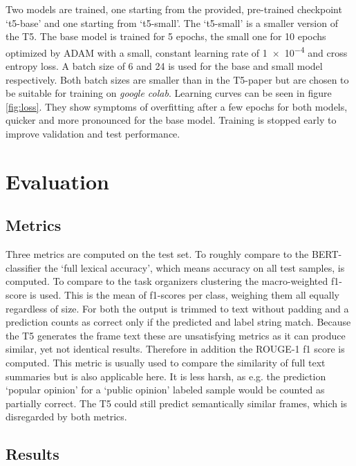 \documentclass[11pt,a4paper,onecolumn,oneside,notitlepage]{article}
\begin{document}
Two models are trained, one starting from the provided, pre-trained checkpoint ‘t5-base’ and one starting from ‘t5-small’. The ‘t5-small’ is a smaller version of the T5. The base model is trained for \num{5} epochs, the small one for \num{10} epochs optimized by ADAM \citep{kingma2017adam} with a small, constant learning rate of \num{1e-4} and cross entropy loss. A batch size of 6 and 24 is used for the base and small model respectively. Both batch sizes are smaller than in the T5-paper but are chosen to be suitable for training on \textit{google colab}. Learning curves can be seen in figure \ref{fig:loss}. They show symptoms of overfitting after a few epochs for both models, quicker and more pronounced for the base model. Training is stopped early to improve validation and test performance.

\section{Evaluation}
\subsection{Metrics}
Three metrics are computed on the test set. To roughly compare to the BERT-classifier the ‘full lexical accuracy’, which means accuracy on all test samples, is computed. To compare to the task organizers clustering the macro-weighted f1-score is used. This is the mean of f1-scores per class, weighing them all equally regardless of size. For both the output is trimmed to text without padding and a prediction counts as correct only if the predicted and label string match. Because the T5 generates the frame text these are unsatisfying metrics as it can produce similar, yet not identical results. Therefore in addition the ROUGE-1 f1 \citep{rouge} score is computed. This metric is usually used to compare the similarity of full text summaries but is also applicable here. It is less harsh, as e.g. the prediction ‘popular opinion’ for a ‘public opinion’ labeled sample would be counted as partially correct. The T5 could still predict semantically similar frames, which is disregarded by both metrics.

\subsection{Results}
\end{document}

